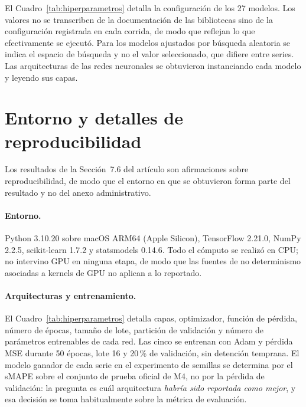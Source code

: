 El Cuadro~\ref{tab:hiperparametros} detalla la configuración de los 27 modelos.
Los valores no se transcriben de la documentación de las bibliotecas sino de la
configuración registrada en cada corrida, de modo que reflejan lo que
efectivamente se ejecutó. Para los modelos ajustados por búsqueda aleatoria se
indica el espacio de búsqueda y no el valor seleccionado, que difiere entre
series. Las arquitecturas de las redes neuronales se obtuvieron instanciando cada
modelo y leyendo sus capas.




\section{Entorno y detalles de reproducibilidad}\label{ap:repro}

Los resultados de la Sección~7.6 del artículo son afirmaciones sobre
reproducibilidad, de modo que el entorno en que se obtuvieron forma parte del
resultado y no del anexo administrativo.

\paragraph{Entorno.} Python 3.10.20 sobre macOS ARM64 (Apple Silicon), TensorFlow
2.21.0, NumPy 2.2.5, scikit-learn 1.7.2 y statsmodels 0.14.6. Todo el cómputo se
realizó en CPU; no intervino GPU en ninguna etapa, de modo que las fuentes de
no determinismo asociadas a kernels de GPU no aplican a lo reportado.

\paragraph{Arquitecturas y entrenamiento.} El Cuadro~\ref{tab:hiperparametros} detalla
capas, optimizador, función de pérdida, número de épocas, tamaño de lote, partición de
validación y número de parámetros entrenables de cada red. Las cinco se entrenan con
Adam y pérdida MSE durante 50 épocas, lote 16 y 20\,\% de validación, sin detención
temprana. El modelo ganador de cada serie en el experimento de semillas se determina por
el sMAPE sobre el conjunto de prueba oficial de M4, no por la pérdida de validación:
la pregunta es cuál arquitectura \emph{habría sido reportada como mejor}, y esa
decisión se toma habitualmente sobre la métrica de evaluación.

